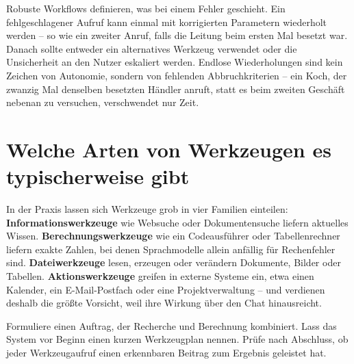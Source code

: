 Robuste Workflows definieren, was bei einem Fehler geschieht. Ein fehlgeschlagener Aufruf kann einmal mit korrigierten Parametern wiederholt werden -- so wie ein zweiter Anruf, falls die Leitung beim ersten Mal besetzt war. Danach sollte entweder ein alternatives Werkzeug verwendet oder die Unsicherheit an den Nutzer eskaliert werden. Endlose Wiederholungen sind kein Zeichen von Autonomie, sondern von fehlenden Abbruchkriterien -- ein Koch, der zwanzig Mal denselben besetzten Händler anruft, statt es beim zweiten Geschäft nebenan zu versuchen, verschwendet nur Zeit.

\section{Welche Arten von Werkzeugen es typischerweise gibt}

In der Praxis lassen sich Werkzeuge grob in vier Familien einteilen: \textbf{Informationswerkzeuge} wie Websuche oder Dokumentensuche liefern aktuelles Wissen. \textbf{Berechnungswerkzeuge} wie ein Codeausführer oder Tabellenrechner liefern exakte Zahlen, bei denen Sprachmodelle allein anfällig für Rechenfehler sind. \textbf{Dateiwerkzeuge} lesen, erzeugen oder verändern Dokumente, Bilder oder Tabellen. \textbf{Aktionswerkzeuge} greifen in externe Systeme ein, etwa einen Kalender, ein E-Mail-Postfach oder eine Projektverwaltung -- und verdienen deshalb die größte Vorsicht, weil ihre Wirkung über den Chat hinausreicht.

\begin{praxis}
Formuliere einen Auftrag, der Recherche und Berechnung kombiniert. Lass das System vor Beginn einen kurzen Werkzeugplan nennen. Prüfe nach Abschluss, ob jeder Werkzeugaufruf einen erkennbaren Beitrag zum Ergebnis geleistet hat.
\end{praxis}

